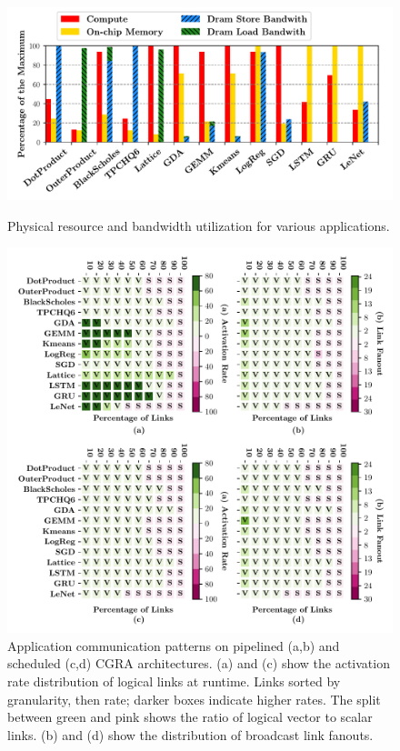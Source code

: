 \begin{figure}
\centering
\includegraphics[width=1\columnwidth]{figs/util_bw2.pdf}
\caption{Physical resource and bandwidth utilization for various applications.}\label{fig:util_bw}
\centering
\includegraphics[width=1\columnwidth]{figs/link7.pdf}
  \caption{Application communication patterns on pipelined (a,b) and scheduled (c,d) CGRA architectures.
  (a) and (c) show the activation rate distribution of logical links at runtime. 
  Links sorted by granularity, then rate; darker boxes indicate higher rates.
  The split between green and pink shows the ratio of logical vector to scalar links. (b) and (d) show the distribution of broadcast link fanouts.
 }\label{fig:link}
\end{figure}

